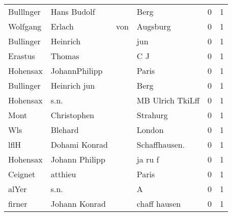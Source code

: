 \begin{tabular}{llllrr}
                Bulllnger &                        Hans Budolf &             &                                        Berg &          0 &         1 \\
                 Wolfgang &                             Erlach &         von &                                    Augsburg &          0 &         1 \\
                Bullinger &                           Heinrich &             &                                         jun &          0 &         1 \\
                  Erastus &                             Thomas &             &                                         C J &          0 &         1 \\
                 Hohensax &                      JohannPhilipp &             &                                       Paris &          0 &         1 \\
                Bullinger &                       Heinrich jun &             &                                        Berg &          0 &         1 \\
                 Hohensax &                               s.n. &             &                            MB Ulrich TkiLff &          0 &         1 \\
                     Mont &                        Christophen &             &                                    Strahurg &          0 &         1 \\
                      Wls &                            Blehard &             &                                      London &          0 &         1 \\
                     lflH &                      Dohami Konrad &             &                              Schaffhausen.  &          0 &         1 \\
                 Hohensax &                     Johann Philipp &             &                                     ja ru f &          0 &         1 \\
                  Ceignet &                            atthieu &             &                                       Paris &          0 &         1 \\
                    alYer &                               s.n. &             &                                           A &          0 &         1 \\
                   firner &                      Johann Konrad &             &                                chaff hausen &          0 &         1 \\

\end{tabular}
